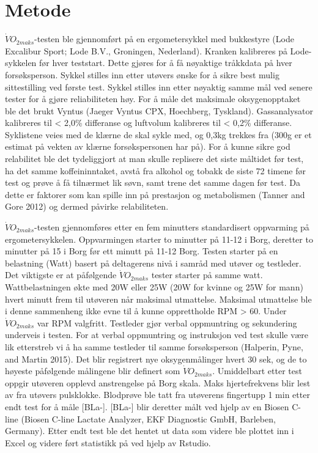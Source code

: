 \documentclass[
  letterpaper,
  DIV=11,
  numbers=noendperiod]{scrreprt}
\begin{document}
\section{Metode}\label{metode}

\(\dot{V}O_{2maks}\)-testen ble gjennomført på en ergometersykkel med
bukkestyre (Lode Excalibur Sport; Lode B.V., Groningen, Nederland).
Kranken kalibreres på Lode-sykkelen før hver teststart. Dette gjøres for
å få nøyaktige tråkkdata på hver forsøksperson. Sykkel stilles inn etter
utøvers ønske for å sikre best mulig sittestilling ved første test.
Sykkel stilles inn etter nøyaktig samme mål ved senere tester for å
gjøre reliabiliteten høy. For å måle det maksimale oksygenopptaket ble
det brukt Vyntus (Jaeger Vyntus CPX, Hoechberg, Tyskland).
Gassanalysator kalibreres til \textless{} 2,0\% differanse og luftvolum
kalibreres til \textless{} 0,2\% differanse. Syklistene veies med de
klærne de skal sykle med, og 0,3kg trekkes fra (300g er et estimat på
vekten av klærne forsøkspersonen har på). For å kunne sikre god
relabilitet ble det tydeliggjort at man skulle replisere det siste
måltidet før test, ha det samme koffeininntaket, avstå fra alkohol og
tobakk de siste 72 timene før test og prøve å få tilnærmet lik søvn,
samt trene det samme dagen før test. Da dette er faktorer som kan spille
inn på prestasjon og metabolismen (Tanner and Gore 2012) og dermed
påvirke relabiliteten.

\(\dot{V}O_{2maks}\)-testen gjennomføres etter en fem minutters
standardisert oppvarming på ergometersykkelen. Oppvarmingen starter to
minutter på 11-12 i Borg, deretter to minutter på 15 i Borg før ett
minutt på 11-12 Borg. Testen starter på en belastning (Watt) basert på
deltagerens nivå i samråd med utøver og testleder. Det viktigste er at
påfølgende \(\dot{V}O_{2maks}\) tester starter på samme watt.
Wattbelastningen økte med 20W eller 25W (20W for kvinne og 25W for mann)
hvert minutt frem til utøveren når maksimal utmattelse. Maksimal
utmattelse ble i denne sammenheng ikke evne til å kunne opprettholde RPM
\textgreater{} 60. Under \(\dot{V}O_{2maks}\) var RPM valgfritt.
Testleder gjør verbal oppmuntring og sekundering underveis i testen. For
at verbal oppmuntring og instruksjon ved test skulle være lik etterstreb
vi å ha samme testleder til samme forsøksperson (Halperin, Pyne, and
Martin 2015). Det blir registrert nye oksygenmålinger hvert 30 sek, og
de to høyeste påfølgende målingene blir definert som
\(\dot{V}O_{2maks}\). Umiddelbart etter test oppgir utøveren opplevd
anstrengelse på Borg skala. Maks hjertefrekvens blir lest av fra utøvers
pulsklokke. Blodprøve ble tatt fra utøverens fingertupp 1 min etter endt
test for å måle {[}BLa-{]}. {[}BLa-{]} blir deretter målt ved hjelp av
en Biosen C-line (Biosen C-line Lactate Analyzer, EKF Diagnostic GmbH,
Barleben, Germany). Etter endt test ble det hentet ut data som videre
ble plottet inn i Excel og videre ført statistikk på ved hjelp av
Rstudio.
\end{document}
